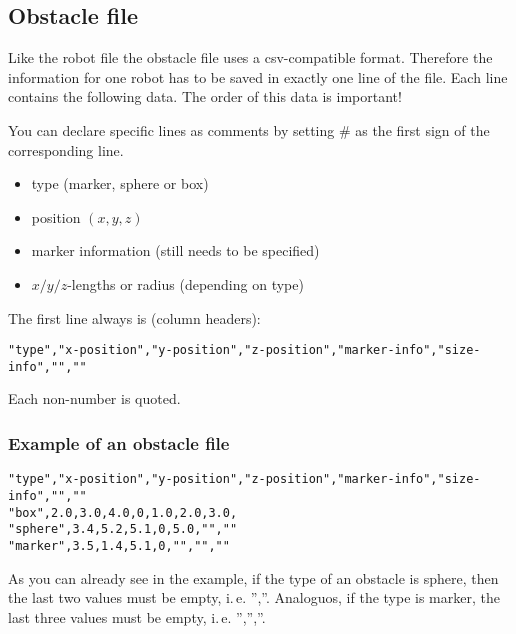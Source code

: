 \subsection{Obstacle file}
Like the robot file the obstacle file uses a csv-compatible format. 
Therefore the information for one robot has to be saved in exactly one line of the file.
Each line contains the following data. The order of this data is important!

You can declare specific lines as comments by setting \# as the first sign of
the corresponding line.
\begin{itemize}
	\item type (marker, sphere or box)
	\item position $(x,y,z)$
	\item marker information (still needs to be specified)
	\item $x/y/z$-lengths or radius (depending on type)
\end{itemize}

The first line always is (column headers):
\begin{lstlisting}
"type","x-position","y-position","z-position","marker-info","size-info","",""
\end{lstlisting}
Each non-number is quoted.


\subsubsection{Example of an obstacle file}
\begin{lstlisting}
"type","x-position","y-position","z-position","marker-info","size-info","",""
"box",2.0,3.0,4.0,0,1.0,2.0,3.0,
"sphere",3.4,5.2,5.1,0,5.0,"",""
"marker",3.5,1.4,5.1,0,"","",""
\end{lstlisting}
As you can already see in the example, if the type of an obstacle is sphere, then the last two values must be empty, i.\,e. '',''. Analoguos, if the type is marker, the last three values must be empty, i.\,e. '','',''.
